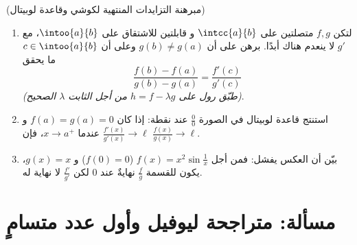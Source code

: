 \begin{exercise}[$\star\star\star$]\label{exo:b1:derivative:12}
(مبرهنة التزايدات المنتهية لكوشي وقاعدة لوبيتال)
\begin{enumerate}
  \item لتكن $f, g$ متصلتين على $\intcc{a}{b}$ و
        قابلتين للاشتقاق على $\intoo{a}{b}$، مع $g'$ لا ينعدم
        هناك أبدًا. برهن على أن $g(b) \neq g(a)$ وعلى أن $c \in
        \intoo{a}{b}$ ما يحقق
        \[
        \frac{f(b) - f(a)}{g(b) - g(a)} = \frac{f'(c)}{g'(c)}
        \]
        \emph{(طبّق رول على $h = f - \lambda g$ من أجل الثابت
        $\lambda$ الصحيح)}.
  \item استنتج قاعدة لوبيتال في الصورة $\frac00$ عند
        نقطة: إذا كان $f(a) = g(a) = 0$ و
        $\frac{f'(x)}{g'(x)} \to \ell$ عندما $x \to a^+$، فإن
        $\frac{f(x)}{g(x)} \to \ell$.
  \item بيّن أن العكس يفشل: فمن أجل $f(x) = x^2\sin\frac1x$
        ($f(0) = 0$) و $g(x) = x$، يكون للقسمة
        $\frac{f}{g}$ نهايةٌ عند $0$ لكن
        $\frac{f'}{g'}$ لا نهاية له.
\end{enumerate}
\end{exercise}

\section{مسألة: متراجحة ليوفيل وأول عدد
متسامٍ}

